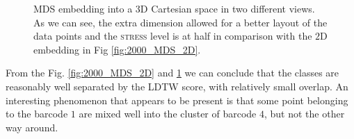 \begin{figure}%
    \centering
    \qquad
    \caption[MDS projection to $3$D space]{MDS embedding into a $3$D Cartesian space in two different views. As we can see, the extra dimension allowed for a better layout of the data points and the \textsc{stress} level is at half in comparison with the $2$D embedding in Fig \ref{fig:2000_MDS_2D}.}
    \label{fig:2000_MDS_3D}
\end{figure}

From the Fig. \ref{fig:2000_MDS_2D} and \ref{fig:2000_MDS_3D} we can conclude that the classes are reasonably well separated by the LDTW score, with relatively small overlap. An interesting phenomenon that appears to be present is that some point belonging to the barcode $1$ are mixed well into the cluster of barcode $4$, but not the other way around.

